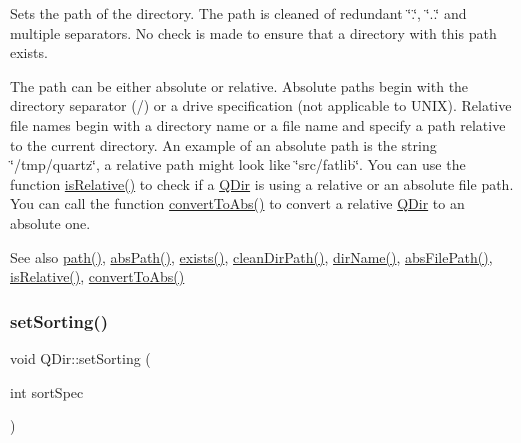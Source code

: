 Sets the path of the directory. The path is cleaned of redundant \char`\"{}.\char`\"{}, \char`\"{}..\char`\"{} and multiple separators. No check is made to ensure that a directory with this path exists.

The path can be either absolute or relative. Absolute paths begin with the directory separator (\textquotesingle{}/\textquotesingle{}) or a drive specification (not applicable to U\+N\+IX). Relative file names begin with a directory name or a file name and specify a path relative to the current directory. An example of an absolute path is the string \char`\"{}/tmp/quartz\char`\"{}, a relative path might look like \char`\"{}src/fatlib\char`\"{}. You can use the function \mbox{\hyperlink{class_q_dir_a2b420c4c2e7b5764ab1fb35e37d1726f}{is\+Relative()}} to check if a \mbox{\hyperlink{class_q_dir}{Q\+Dir}} is using a relative or an absolute file path. You can call the function \mbox{\hyperlink{class_q_dir_a0c05c8978b3b4158233f809e4d30c55d}{convert\+To\+Abs()}} to convert a relative \mbox{\hyperlink{class_q_dir}{Q\+Dir}} to an absolute one.

\begin{DoxySeeAlso}{See also}
\mbox{\hyperlink{class_q_dir_a6258e0803c991909e0ce38e40f6f07ec}{path()}}, \mbox{\hyperlink{class_q_dir_a1464e556606a3223b8db1b3629c41cb7}{abs\+Path()}}, \mbox{\hyperlink{class_q_dir_a97e8132d482e374745230de942def208}{exists()}}, \mbox{\hyperlink{class_q_dir_ad38037708dc754f5bdd877c145dbbb19}{clean\+Dir\+Path()}}, \mbox{\hyperlink{class_q_dir_a2c904d64a7194a57ee583d111cbbdeff}{dir\+Name()}}, \mbox{\hyperlink{class_q_dir_aca84b0a728bc2b88c3ab55cbed6e18c4}{abs\+File\+Path()}}, \mbox{\hyperlink{class_q_dir_a2b420c4c2e7b5764ab1fb35e37d1726f}{is\+Relative()}}, \mbox{\hyperlink{class_q_dir_a0c05c8978b3b4158233f809e4d30c55d}{convert\+To\+Abs()}} 
\end{DoxySeeAlso}
\mbox{\label{class_q_dir_a65280d204cd65975953e3eb2a63da778}} 
\subsubsection{\texorpdfstring{setSorting()}{setSorting()}}
{\footnotesize\ttfamily void Q\+Dir\+::set\+Sorting (\begin{DoxyParamCaption}\item[{int}]{sort\+Spec }\end{DoxyParamCaption})\hspace{0.3cm}{\ttfamily [virtual]}}

